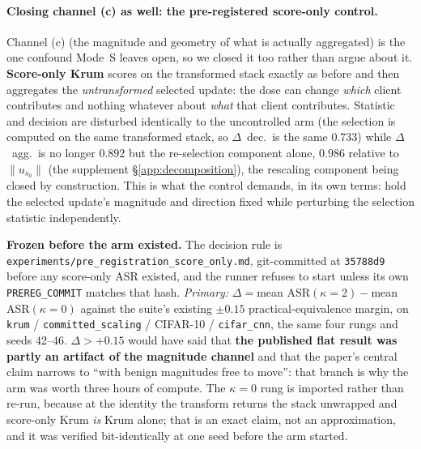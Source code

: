 \documentclass{article}
\begin{document}
\paragraph{Closing channel (c) as well: the pre-registered score-only control.} Channel (c) (the magnitude and geometry of what is actually aggregated) is the one confound Mode~S leaves open, so we closed it too rather than argue about it. \textbf{Score-only Krum} scores on the transformed stack exactly as before and then aggregates the \emph{untransformed} selected update: the dose can change \emph{which} client contributes and nothing whatever about \emph{what} that client contributes. Statistic and decision are disturbed identically to the uncontrolled arm (the selection is computed on the same transformed stack, so $\Delta$~dec.\ is the same $0.733$) while $\Delta$~agg.\ is no longer $0.892$ but the re-selection component alone, $0.986$ relative to $\|u_{s_0}\|$ (the supplement §\ref{app:decomposition}), the rescaling component being closed by construction. This is what the control demands, in its own terms: hold the selected update's magnitude and direction fixed while perturbing the selection statistic independently.

\textbf{Frozen before the arm existed.} The decision rule is \texttt{experiments/\allowbreak pre\_registration\_score\_only.md}, git-committed at \texttt{35788d9} before any score-only ASR existed, and the runner refuses to start unless its own \texttt{PREREG\_COMMIT} matches that hash. \emph{Primary:} $\Delta = {}$mean ASR$(\kappa{=}2) - {}$mean ASR$(\kappa{=}0)$ against the suite's existing $\pm 0.15$ practical-equivalence margin, on \texttt{krum} / \texttt{committed\_scaling} / CIFAR-10 / \texttt{cifar\_cnn}, the same four rungs and seeds 42--46. $\Delta > +0.15$ would have said that \textbf{the published flat result was partly an artifact of the magnitude channel} and that the paper's central claim narrows to ``with benign magnitudes free to move'': that branch is why the arm was worth three hours of compute. The $\kappa{=}0$ rung is imported rather than re-run, because at the identity the transform returns the stack unwrapped and score-only Krum \emph{is} Krum alone; that is an exact claim, not an approximation, and it was verified bit-identically at one seed before the arm started.
\end{document}
